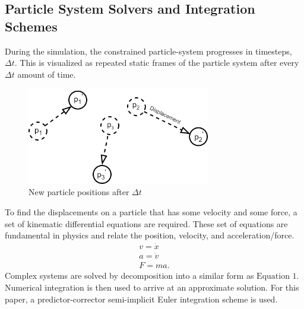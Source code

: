 \documentclass[12pt, letterpaper]{article}
\begin{document}
\subsection{Particle System Solvers and Integration Schemes}
\hspace{\parindent} During the simulation, the constrained particle-system progresses in timesteps, $\Delta t$. This is visualized as repeated static frames of the particle system after every $\Delta t$ amount of time.
\begin{figure}[H]
\centering
\includegraphics[width=8cm]{particle system.png}
\caption{New particle positions after $\Delta t$}
\label{fig:figure}
\end{figure} 
To find the displacements on a particle that has some velocity and some force, a set of kinematic differential equations are required. These set of equations are fundamental in physics and relate the position, velocity, and acceleration/force.  
\begin{equation}
   \begin{gathered}
        v = \dot{x}\\ 
        a = \dot{v}\\
        F = ma.
    \end{gathered} 
\end{equation}
Complex systems are solved by decomposition into a similar form as $\text{Equation 1}$. Numerical integration is then used to arrive at an approximate solution. For this paper, a predictor-corrector semi-implicit Euler integration scheme is used.
\end{document}

